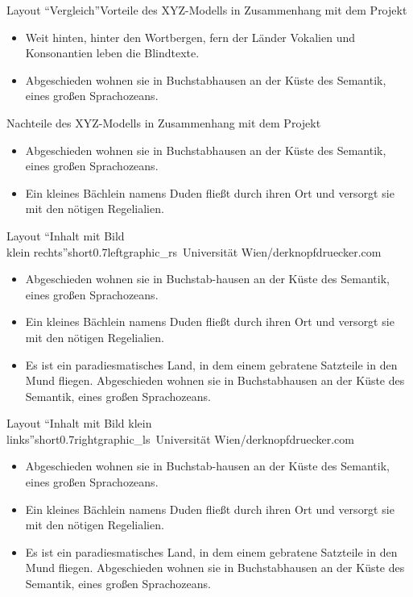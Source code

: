 \documentclass[hyperref={pdfpagelabels=false}, aspectratio=169, t]{beamer}  %
\begin{document}
\begin{textFrame2}{Layout ``Vergleich''}{Vorteile des XYZ-Modells in Zusammenhang \newline mit dem Projekt}%
{
		\begin{itemize}
			\item Weit hinten, hinter den Wortbergen, fern der Länder Vokalien und Konsonantien leben die Blindtexte.
			\item Abgeschieden wohnen sie in Buchstabhausen an der Küste des Semantik, eines großen Sprachozeans. 
		\end{itemize}
}{}{Nachteile des XYZ-Modells in Zusammenhang \newline mit dem Projekt}{
		\begin{itemize}
			\item Abgeschieden wohnen sie in Buchstabhausen an der Küste des Semantik, eines großen Sprachozeans.
			\item Ein kleines Bächlein namens Duden fließt durch ihren Ort und versorgt sie mit den nötigen Regelialien. 
		\end{itemize}
}{}
\end{textFrame2}

\begin{graphicsFrame}{Layout ``Inhalt mit Bild \\ klein rechts''}{short}{0.7}{left}{graphic_rs}{\textcopyright~Universität Wien/derknopfdruecker.com}

		\begin{itemize}
			\item Abgeschieden wohnen sie in Buchstab-hausen an der Küste des Semantik, eines großen Sprachozeans.
			\item Ein kleines Bächlein namens Duden fließt durch ihren Ort und versorgt sie mit den nötigen Regelialien.
			\item Es ist ein paradiesmatisches Land, in dem einem gebratene Satzteile in den Mund fliegen. Abgeschieden wohnen sie in Buchstabhausen an der Küste des Semantik, eines großen Sprachozeans. 
		\end{itemize}

\end{graphicsFrame}

\begin{graphicsFrame}{Layout ``Inhalt mit Bild klein \\ links''}{short}{0.7}{right}{graphic_ls}{\textcopyright~Universität Wien/derknopfdruecker.com}

		\begin{itemize}
			\item Abgeschieden wohnen sie in Buchstab-hausen an der Küste des Semantik, eines großen Sprachozeans.
			\item Ein kleines Bächlein namens Duden fließt durch ihren Ort und versorgt sie mit den nötigen Regelialien.
			\item Es ist ein paradiesmatisches Land, in dem einem gebratene Satzteile in den Mund fliegen. Abgeschieden wohnen sie in Buchstabhausen an der Küste des Semantik, eines großen Sprachozeans.
		\end{itemize}

\end{graphicsFrame}
\end{document}
